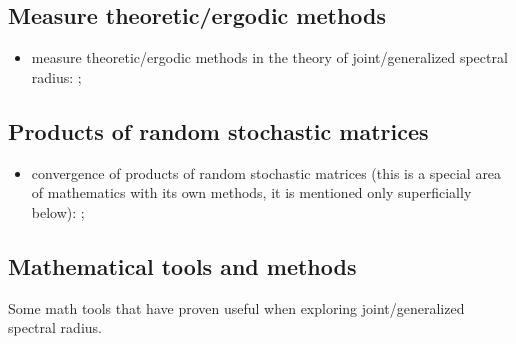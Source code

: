\documentclass[a4paper,fleqn]{article}
\let\cite=\citep
\begin{document}
\subsection*{Measure theoretic/ergodic methods}
\begin{itemize}
  \item measure theoretic/ergodic methods in the theory of joint/generalized
    spectral radius: \cite{AltPar:CDC19, AltPar:SIAMJCO20, BochiRams:JMD16,
      BG:JEP19, BM:JAMS02, Dai:N11, Dai:JDE11, Dai:LAA12, Dai:JFI14,
      DHX:SIAMJCO08, DHX:CDC08, DHX:ArXiv11:1, DHX:ERA11, DHX:AUT11,
      DHX:PAMS13, DHX:IEEETAC15, Gomes:2017, KM:ArXiv25, Moh:JSP22,
      Morris:ADVM10, Morris:JFA12, Morris:PLMS13, Morris:EDTS17,
      Morris:EDTS17:2, NSch:LAA99, OgurMart:LAA14, ZCL:DCDSA18};
\end{itemize}

\subsection*{Products of random stochastic matrices}
\begin{itemize}
  \item convergence of products of random stochastic matrices (this is a
    special area of mathematics with its own methods, it is mentioned only
    superficially below): \cite{AT:JMAA77, BXMS:IEEETSP13, Cohn:IJMMS,
      CMS:LAA21, CMMS:EJP23, DHH:ArXiv14, DHX:AUT11, OgurMart:LAA13,
      Leiz:LAA92, LimaRah:JPA94, MTG:ArXiv25, OM:ArXiv26, Prot:MS11,
      Thomas:ArXiv11, Thomas:ArXiv13, Wolf:PAMS};
\end{itemize}

\subsection*{Mathematical tools and methods}
Some math tools that have proven useful when exploring
joint/generalized spectral radius.
\end{document}
